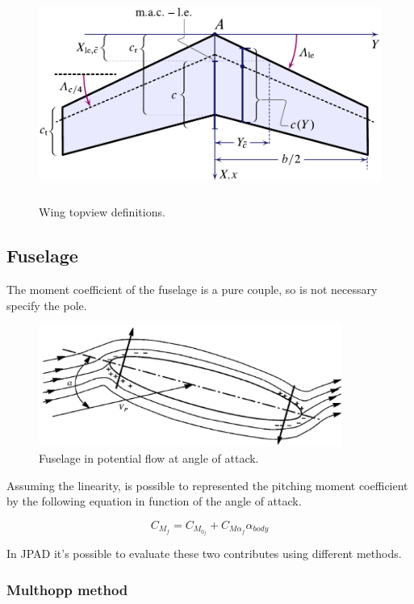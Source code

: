 \begin{figure}[H]
\centering
\includegraphics[height=7cm]{Immagini/wing_topview_1_new}
\caption{Wing topview definitions.}
\label{wing}
\end{figure}




\subsection{Fuselage}
The moment coefficient of the fuselage is a pure couple, so is not necessary specify the pole.


\begin{figure}[H]
\centering
\includegraphics[height=4cm]{Immagini/fuse}
\caption{Fuselage in potential flow at angle of attack.}
\label{fus}
\end{figure}


Assuming the linearity, is possible to represented the pitching moment coefficient by the following equation in function of the angle of attack.

\begin{equation}
C_{M_f}=C_{M_{0_f}}+C_{{M\alpha}_f} \alpha_{body}
\label{eq:fus}
\end{equation}

In JPAD it's possible to evaluate these two contributes using different methods.

\subsubsection{Multhopp method}

